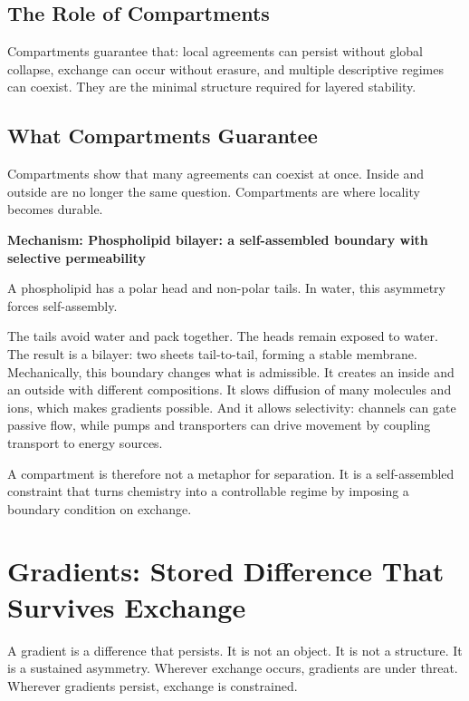 \documentclass[11pt,twoside,openright]{book}
\newenvironment{mechanismbox}[1]
  {\begin{framed}\noindent\textbf{Mechanism: #1}\par\medskip}
  {\end{framed}}
\begin{document}
\section*{The Role of Compartments}

Compartments guarantee that: local agreements can persist without global collapse, exchange can occur without erasure, and multiple descriptive regimes can coexist. They are the minimal structure required for layered stability.

\section*{What Compartments Guarantee}

Compartments show that many agreements can coexist at once. Inside and outside are no longer the same question. Compartments are where locality becomes durable.



\begin{mechanismbox}{Phospholipid bilayer: a self-assembled boundary with selective permeability}
A phospholipid has a polar head and non-polar tails.
In water, this asymmetry forces self-assembly.

The tails avoid water and pack together. The heads remain exposed to water. The result is a bilayer: two sheets tail-to-tail, forming a stable membrane. Mechanically, this boundary changes what is admissible. It creates an inside and an outside with different compositions. It slows diffusion of many molecules and ions, which makes gradients possible. And it allows selectivity: channels can gate passive flow, while pumps and transporters can drive movement by coupling transport to energy sources.

A compartment is therefore not a metaphor for separation.
It is a self-assembled constraint that turns chemistry into a controllable regime by imposing a boundary condition on exchange.
\end{mechanismbox}

\chapter{Gradients: Stored Difference That Survives Exchange}

A gradient is a difference that persists. It is not an object. It is not a structure. It is a sustained asymmetry. Wherever exchange occurs, gradients are under threat. Wherever gradients persist, exchange is constrained.
\end{document}
